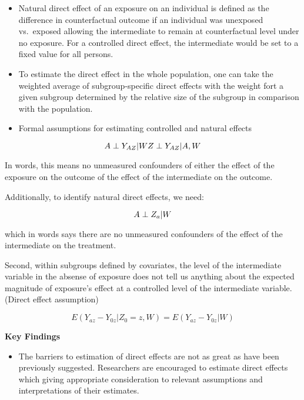 \documentclass[
]{book}
\providecommand{\tightlist}{%
  \setlength{\itemsep}{0pt}\setlength{\parskip}{0pt}}
\begin{document}
\begin{itemize}
\tightlist
\item
  Natural direct effect of an exposure on an individual is defined as the difference in counterfactual outcome if an individual was unexposed vs.~exposed allowing the intermediate to remain at counterfactual level under no exposure. For a controlled direct effect, the intermediate would be set to a fixed value for all persons.
\item
  To estimate the direct effect in the whole population, one can take the weighted average of subgroup-specific direct effects with the weight fort a given subgroup determined by the relative size of the subgroup in comparison with the population.
\item
  Formal assumptions for estimating controlled and natural effects
\end{itemize}

\begin{equation}
A \perp Y_{AZ} | W \\ 
Z \perp Y_{AZ} | A, W
\end{equation}

In words, this means no unmeasured confounders of either the effect of the exposure on the outcome of the effect of the intermediate on the outcome.

Additionally, to identify natural direct effects, we need:

\begin{equation}
A \perp Z_a | W \\ 
\end{equation}

which in words says there are no unmeasured confounders of the effect of the intermediate on the treatment.

Second, within subgroups defined by covariates, the level of the intermediate variable in the absense of exposure does not tell us anything about the expected magnitude of exposure's effect at a controlled level of the intermediate variable. (Direct effect assumption)

\begin{equation}
E(Y_{az} - Y_{0z} | Z_0 = z, W) = E(Y_{az} - Y_{0z} | W)
\end{equation}

\textbf{Key Findings}

\begin{itemize}
\tightlist
\item
  The barriers to estimation of direct effects are not as great as have been previously suggested. Researchers are encouraged to estimate direct effects which giving appropriate consideration to relevant assumptions and interpretations of their estimates.
\end{itemize}
\end{document}
